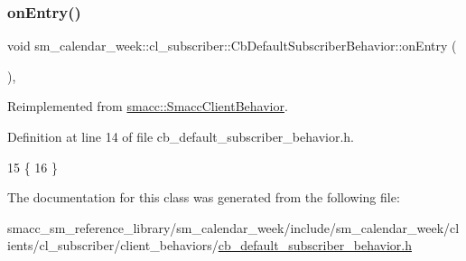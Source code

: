 \subsubsection{\texorpdfstring{on\+Entry()}{onEntry()}}
{\footnotesize\ttfamily void sm\+\_\+calendar\+\_\+week\+::cl\+\_\+subscriber\+::\+Cb\+Default\+Subscriber\+Behavior\+::on\+Entry (\begin{DoxyParamCaption}{ }\end{DoxyParamCaption})\hspace{0.3cm}{\ttfamily [inline]}, {\ttfamily [virtual]}}



Reimplemented from \hyperlink{classsmacc_1_1SmaccClientBehavior_ad5d3e1f1697c3cfe66c94cadba948493}{smacc\+::\+Smacc\+Client\+Behavior}.



Definition at line 14 of file cb\+\_\+default\+\_\+subscriber\+\_\+behavior.\+h.


\begin{DoxyCode}
15     \{
16     \}
\end{DoxyCode}


The documentation for this class was generated from the following file\+:\begin{DoxyCompactItemize}
\item 
smacc\+\_\+sm\+\_\+reference\+\_\+library/sm\+\_\+calendar\+\_\+week/include/sm\+\_\+calendar\+\_\+week/clients/cl\+\_\+subscriber/client\+\_\+behaviors/\hyperlink{sm__calendar__week_2include_2sm__calendar__week_2clients_2cl__subscriber_2client__behaviors_2cb_2dd2f4ccb4741b9c6659a707c9fdb5ee}{cb\+\_\+default\+\_\+subscriber\+\_\+behavior.\+h}\end{DoxyCompactItemize}
